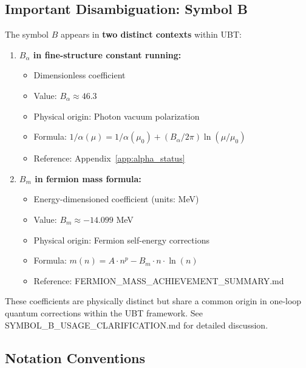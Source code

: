 \subsection{Important Disambiguation: Symbol B}

The symbol $B$ appears in \textbf{two distinct contexts} within UBT:

\begin{enumerate}
\item \textbf{$B_\alpha$ in fine-structure constant running:}
   \begin{itemize}
   \item Dimensionless coefficient
   \item Value: $B_\alpha \approx 46.3$
   \item Physical origin: Photon vacuum polarization
   \item Formula: $1/\alpha(\mu) = 1/\alpha(\mu_0) + (B_\alpha/2\pi)\ln(\mu/\mu_0)$
   \item Reference: Appendix~\ref{app:alpha_status}
   \end{itemize}

\item \textbf{$B_m$ in fermion mass formula:}
   \begin{itemize}
   \item Energy-dimensioned coefficient (units: MeV)
   \item Value: $B_m \approx -14.099$ MeV
   \item Physical origin: Fermion self-energy corrections
   \item Formula: $m(n) = A \cdot n^p - B_m \cdot n \cdot \ln(n)$
   \item Reference: FERMION\_MASS\_ACHIEVEMENT\_SUMMARY.md
   \end{itemize}
\end{enumerate}

These coefficients are physically distinct but share a common origin in one-loop quantum corrections within the UBT framework. See SYMBOL\_B\_USAGE\_CLARIFICATION.md for detailed discussion.

\subsection{Notation Conventions}

